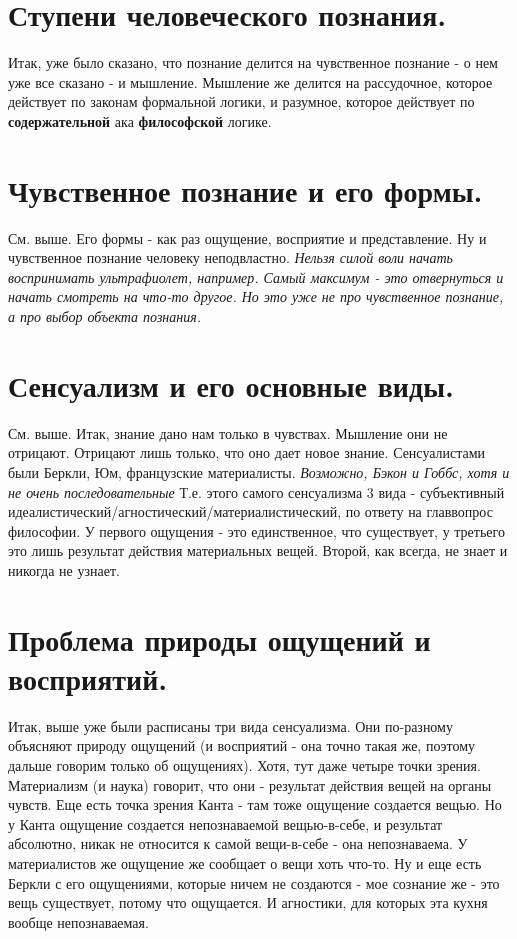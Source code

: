 \section{ Ступени человеческого познания.}
Итак, уже было сказано, что познание делится на чувственное познание - о нем уже все сказано - и мышление. Мышление же делится на рассудочное, которое действует по законам формальной логики, и разумное, которое действует по \textbf{содержательной} ака \textbf{философской} логике.

\section{ Чувственное познание и его формы.}
См. выше. Его формы - как раз ощущение, восприятие и представление. Ну и чувственное познание человеку неподвластно. \textit{Нельзя силой воли начать воспринимать ультрафиолет, например. Самый максимум - это отвернуться и начать смотреть на что-то другое. Но это уже не про чувственное познание, а про выбор объекта познания.}

\section{ Сенсуализм и его основные виды.}
См. выше. Итак, знание дано нам только в чувствах. Мышление они не отрицают. Отрицают лишь только, что оно дает новое знание. Сенсуалистами были Беркли, Юм, французские материалисты. \textit{Возможно, Бэкон и Гоббс, хотя и не очень последовательные} Т.е. этого самого сенсуализма 3 вида - субъективный идеалистический/агностический/материалистический, по ответу на главвопрос философии. У первого ощущения - это единственное, что существует, у третьего это лишь результат действия материальных вещей. Второй, как всегда, не знает и никогда не узнает.

\section{ Проблема природы ощущений и восприятий.}
Итак, выше уже были расписаны три вида сенсуализма. Они по-разному объясняют природу ощущений (и восприятий - она точно такая же, поэтому дальше говорим только об ощущениях). Хотя, тут даже четыре точки зрения. Материализм (и наука) говорит, что они - результат действия вещей на органы чувств. Еще есть точка зрения Канта - там тоже ощущение создается вещью. Но у Канта ощущение создается непознаваемой вещью-в-себе, и результат абсолютно, никак не относится к самой вещи-в-себе - она непознаваема. У материалистов же ощущение же сообщает о вещи хоть что-то. Ну и еще есть Беркли с его ощущениями, которые ничем не создаются - мое сознание же - это вещь существует, потому что ощущается. И агностики, для которых эта кухня вообще непознаваемая.


